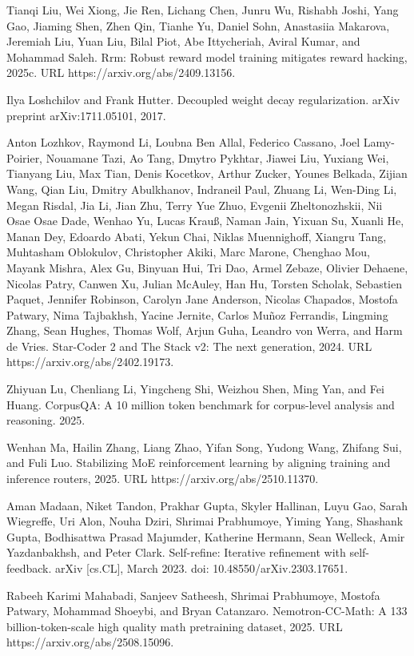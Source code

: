 Tianqi Liu, Wei Xiong, Jie Ren, Lichang Chen, Junru Wu, Rishabh Joshi,
Yang Gao, Jiaming Shen, Zhen Qin, Tianhe Yu, Daniel Sohn, Anastasiia
Makarova, Jeremiah Liu, Yuan Liu, Bilal Piot, Abe Ittycheriah, Aviral
Kumar, and Mohammad Saleh. Rrm: Robust reward model training mitigates
reward hacking, 2025c. URL https://arxiv.org/abs/2409.13156.

Ilya Loshchilov and Frank Hutter. Decoupled weight decay regularization.
arXiv preprint arXiv:1711.05101, 2017.

Anton Lozhkov, Raymond Li, Loubna Ben Allal, Federico Cassano, Joel
Lamy-Poirier, Nouamane Tazi, Ao Tang, Dmytro Pykhtar, Jiawei Liu,
Yuxiang Wei, Tianyang Liu, Max Tian, Denis Kocetkov, Arthur Zucker,
Younes Belkada, Zijian Wang, Qian Liu, Dmitry Abulkhanov, Indraneil
Paul, Zhuang Li, Wen-Ding Li, Megan Risdal, Jia Li, Jian Zhu, Terry Yue
Zhuo, Evgenii Zheltonozhskii, Nii Osae Osae Dade, Wenhao Yu, Lucas
Krauß, Naman Jain, Yixuan Su, Xuanli He, Manan Dey, Edoardo Abati, Yekun
Chai, Niklas Muennighoff, Xiangru Tang, Muhtasham Oblokulov, Christopher
Akiki, Marc Marone, Chenghao Mou, Mayank Mishra, Alex Gu, Binyuan Hui,
Tri Dao, Armel Zebaze, Olivier Dehaene, Nicolas Patry, Canwen Xu, Julian
McAuley, Han Hu, Torsten Scholak, Sebastien Paquet, Jennifer Robinson,
Carolyn Jane Anderson, Nicolas Chapados, Mostofa Patwary, Nima
Tajbakhsh, Yacine Jernite, Carlos Muñoz Ferrandis, Lingming Zhang, Sean
Hughes, Thomas Wolf, Arjun Guha, Leandro von Werra, and Harm de Vries.
Star-Coder 2 and The Stack v2: The next generation, 2024. URL
https://arxiv.org/abs/2402.19173.

Zhiyuan Lu, Chenliang Li, Yingcheng Shi, Weizhou Shen, Ming Yan, and Fei
Huang. CorpusQA: A 10 million token benchmark for corpus-level analysis
and reasoning. 2025.

Wenhan Ma, Hailin Zhang, Liang Zhao, Yifan Song, Yudong Wang, Zhifang
Sui, and Fuli Luo. Stabilizing MoE reinforcement learning by aligning
training and inference routers, 2025. URL https://arxiv.org/abs/2510.11370.

Aman Madaan, Niket Tandon, Prakhar Gupta, Skyler Hallinan, Luyu Gao,
Sarah Wiegreffe, Uri Alon, Nouha Dziri, Shrimai Prabhumoye, Yiming Yang,
Shashank Gupta, Bodhisattwa Prasad Majumder, Katherine Hermann, Sean
Welleck, Amir Yazdanbakhsh, and Peter Clark. Self-refine: Iterative
refinement with self-feedback. arXiv {[}cs.CL{]}, March 2023. doi:
10.48550/arXiv.2303.17651.

Rabeeh Karimi Mahabadi, Sanjeev Satheesh, Shrimai Prabhumoye, Mostofa
Patwary, Mohammad Shoeybi, and Bryan Catanzaro. Nemotron-CC-Math: A 133
billion-token-scale high quality math pretraining dataset, 2025. URL
https://arxiv.org/abs/2508.15096.


